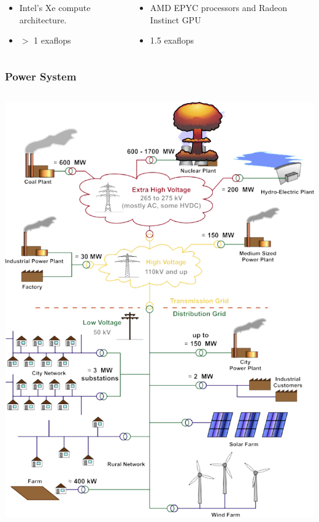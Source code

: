 \begin{frame}
\begin{columns}[T]
\begin{column}{0.49\textwidth}
\begin{itemize}
      \item Intel’s Xe compute architecture.
      \item $>$ 1 exaflops
    \end{itemize}
    \end{column}
    \begin{column}{0.49\textwidth}
      \begin{itemize}
        \item AMD EPYC processors and Radeon Instinct GPU
        \item 1.5 exaflops
      \end{itemize}
    \end{column}
  \end{columns}
\end{frame}

\begin{frame}
  \frametitle{Power System}
  \begin{columns}
    \begin{column}{0.45\textwidth}
      \includegraphics[width=\textwidth]{figures/slides.png}

\end{column}
\end{columns}
\end{frame}
